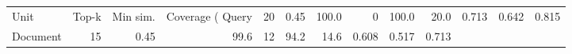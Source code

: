 \begin{tabular}{lrrrrrrrrr}
\toprule
Unit & Top-k & Min sim. & Coverage (%
\midrule
Query & 20 & 0.45 & 100.0 & 0 & 100.0 & 20.0 & 0.713 & 0.642 & 0.815 \\
Document & 15 & 0.45 & 99.6 & 12 & 94.2 & 14.6 & 0.608 & 0.517 & 0.713 \\
\bottomrule
\end{tabular}
